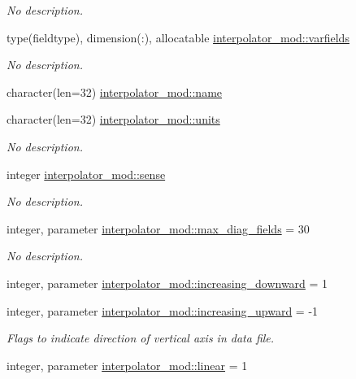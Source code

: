 \begin{DoxyCompactItemize}
\begin{DoxyCompactList}\small\item\em No description. \end{DoxyCompactList}\item 
type(fieldtype), dimension(\+:), allocatable \hyperlink{namespaceinterpolator__mod_af171b4d632062544e7d7a901d55873f9}{interpolator\+\_\+mod\+::varfields}
\begin{DoxyCompactList}\small\item\em No description. \end{DoxyCompactList}\item 
character(len=32) \hyperlink{namespaceinterpolator__mod_a04dfc32d8f8b7d8b153f0f2c340dc07d}{interpolator\+\_\+mod\+::name}
\item 
character(len=32) \hyperlink{namespaceinterpolator__mod_a36fe3672b1616046ddec710084683407}{interpolator\+\_\+mod\+::units}
\begin{DoxyCompactList}\small\item\em No description. \end{DoxyCompactList}\item 
integer \hyperlink{namespaceinterpolator__mod_abdb646751cdc1ebd26725fe4ab4ccd82}{interpolator\+\_\+mod\+::sense}
\begin{DoxyCompactList}\small\item\em No description. \end{DoxyCompactList}\item 
integer, parameter \hyperlink{namespaceinterpolator__mod_ab8f01630409343faf00eff7cf2e78bdb}{interpolator\+\_\+mod\+::max\+\_\+diag\+\_\+fields} = 30
\begin{DoxyCompactList}\small\item\em No description. \end{DoxyCompactList}\item 
integer, parameter \hyperlink{namespaceinterpolator__mod_aaa4b631264950af751c2bb61f8e19dea}{interpolator\+\_\+mod\+::increasing\+\_\+downward} = 1
\item 
integer, parameter \hyperlink{namespaceinterpolator__mod_ae43c206a51b0098e312ae576c2fd3a3f}{interpolator\+\_\+mod\+::increasing\+\_\+upward} = -\/1
\begin{DoxyCompactList}\small\item\em Flags to indicate direction of vertical axis in data file. \end{DoxyCompactList}\item 
integer, parameter \hyperlink{namespaceinterpolator__mod_ad23bea282e48076ad879fc1765f39d33}{interpolator\+\_\+mod\+::linear} = 1

\end{DoxyCompactItemize}
